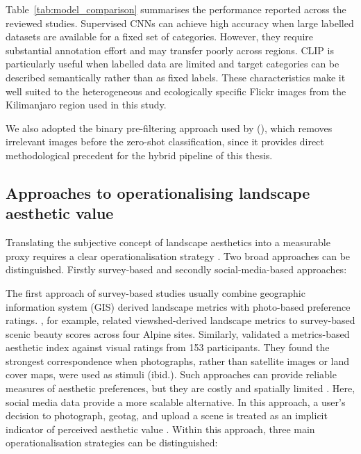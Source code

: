 \documentclass[11pt]{article}
\renewcommand{\_}{\textunderscore\allowbreak{}}
\begin{document}
Table~\ref{tab:model_comparison} summarises the performance reported across the reviewed studies. Supervised CNNs can achieve high accuracy when large labelled datasets are available for a fixed set of categories. However, they require substantial annotation effort and may transfer poorly across regions. CLIP is particularly useful when labelled data are limited and target categories can be described semantically rather than as fixed labels. These characteristics make it well suited to the heterogeneous and ecologically specific Flickr images from the Kilimanjaro region used in this study.

We also adopted the binary pre-filtering approach used by \citeauthor{liao_mapping_2025} (\citeyear{liao_mapping_2025}), which removes irrelevant images before the zero-shot classification, since it provides direct methodological precedent for the hybrid pipeline of this thesis.

\subsection{Approaches to operationalising landscape aesthetic value}

Translating the subjective concept of landscape aesthetics into a measurable proxy requires a clear operationalisation strategy \citep{daniel_whither_2001}. Two broad approaches can be distinguished. Firstly survey-based and secondly social-media-based approaches:

The first approach of survey-based studies usually combine geographic information system (GIS) derived landscape metrics with photo-based preference ratings. \citet{schirpke_predicting_2013}, for example, related viewshed-derived landscape metrics to survey-based scenic beauty scores across four Alpine sites. Similarly, \citet{frank_assessment_2013} validated a metrics-based aesthetic index against visual ratings from 153 participants. They found the strongest correspondence when photographs, rather than satellite images or land cover maps, were used as stimuli (ibid.). Such approaches can provide reliable measures of aesthetic preferences, but they are costly and spatially limited \citep{schirpke_predicting_2013}. Here, social media data provide a more scalable alternative. In this approach, a user's decision to photograph, geotag, and upload a scene is treated as an implicit indicator of perceived aesthetic value \citep{langemeyer_mapping_2018}. Within this approach, three main operationalisation strategies can be distinguished:
\end{document}
